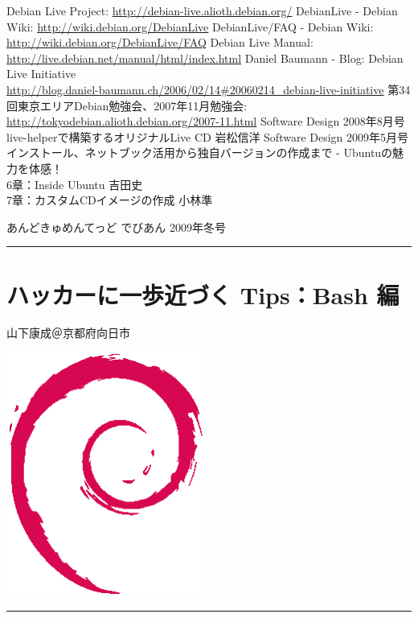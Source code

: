 \documentclass[mingoth,a4paper]{jsarticle}
\renewcommand{\dancersection}[2]{%
\newpage
あんどきゅめんてっど でびあん 2009年冬号
%
\vspace{0.1mm}\\
{\color{dancerlightblue}\rule{\hsize}{2mm}}

%
%
\begin{minipage}[t]{0.6\hsize}
\color{dancerdarkblue}
\vspace{1cm}
\section{#1}
\hfill{}#2\\
\end{minipage}
\begin{minipage}[t]{0.4\hsize}
\vspace{-2cm}
\hfill{}\includegraphics[height=8cm]{image200502/openlogo-nd.eps}\\
\vspace{-5cm}
\end{minipage}
%
%
{\color{dancerdarkblue}\rule{0.74\hsize}{2mm}}
%
\vspace{2cm}
}
\begin{document}
\newpage

\begin{thebibliography}{99}
	 Debian Live Project: \url{http://debian-live.alioth.debian.org/}
	 DebianLive - Debian Wiki: \url{http://wiki.debian.org/DebianLive}
 	 DebianLive/FAQ - Debian Wiki: \url{http://wiki.debian.org/DebianLive/FAQ}
	 Debian Live Manual: \url{http://live.debian.net/manual/html/index.html}
	 Daniel Baumann - Blog: Debian Live Initiative\\
	 \url{http://blog.daniel-baumann.ch/2006/02/14\#20060214_debian-live-initiative}
	 第34回東京エリアDebian勉強会、2007年11月勉強会:\\
	 \url{http://tokyodebian.alioth.debian.org/2007-11.html}
	 Software Design 2008年8月号\\
	 live-helperで構築するオリジナルLive CD 岩松信洋
	 Software Design 2009年5月号\\
	 インストール、ネットブック活用から独自バージョンの作成まで - Ubuntuの魅力を体感！\\
	 6章：Inside Ubuntu 吉田史\\
	 7章：カスタムCDイメージの作成 小林準
\end{thebibliography}

\dancersection{ハッカーに一歩近づく Tips：Bash 編}{山下康成＠京都府向日市}
\end{document}
